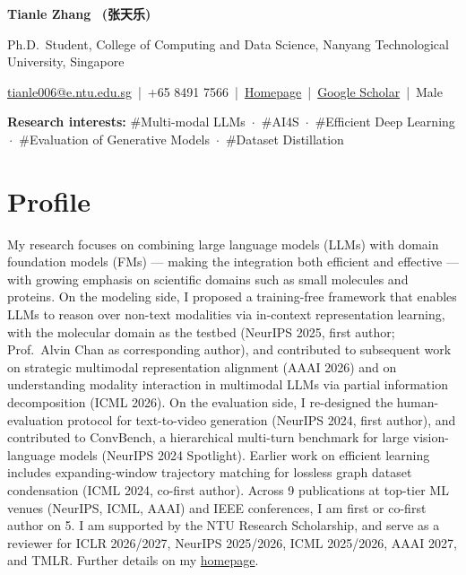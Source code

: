 \documentclass[10pt,a4paper]{article}
\begin{document}
{\Huge\bfseries Tianle Zhang \,\,{\normalsize\mdseries\,({\cjkfont 张天乐})}}\par
\vspace{2pt}
Ph.D.\ Student, College of Computing and Data Science, Nanyang Technological University, Singapore\par
\vspace{1pt}
\href{mailto:tianle006@e.ntu.edu.sg}{tianle006@e.ntu.edu.sg} \,|\, +65 8491 7566 \,|\,
\href{https://ztlmememe.github.io/}{Homepage} \,|\,
\href{https://scholar.google.com.hk/citations?user=Qbd4ybsAAAAJ&hl=en}{Google Scholar} \,|\, Male\par
\vspace{2pt}
{\small\textbf{Research interests:}\;
\#Multi-modal LLMs \,$\cdot$\, \#AI4S \,$\cdot$\, \#Efficient Deep Learning \,$\cdot$\, \#Evaluation of Generative Models \,$\cdot$\, \#Dataset Distillation}

\section*{Profile}
{\small
My research focuses on combining large language models (LLMs) with domain foundation models (FMs) ---
making the integration both efficient and effective --- with growing emphasis on scientific domains
such as small molecules and proteins. On the modeling side, I proposed a training-free framework
that enables LLMs to reason over non-text modalities via in-context representation learning, with
the molecular domain as the testbed (NeurIPS 2025, first author; Prof.\ Alvin Chan as corresponding
author), and contributed to subsequent work on strategic multimodal representation alignment
(AAAI 2026) and on understanding modality interaction in multimodal LLMs via partial information
decomposition (ICML 2026). On the evaluation side, I re-designed the human-evaluation protocol for
text-to-video generation (NeurIPS 2024, first author), and contributed to ConvBench, a hierarchical
multi-turn benchmark for large vision-language models (NeurIPS 2024 Spotlight). Earlier work on
efficient learning includes expanding-window trajectory matching for lossless graph dataset
condensation (ICML 2024, co-first author). Across 9 publications at top-tier ML venues (NeurIPS,
ICML, AAAI) and IEEE conferences, I am first or co-first author on 5. I am supported by the NTU
Research Scholarship, and serve as a reviewer for ICLR 2026/2027, NeurIPS 2025/2026, ICML 2025/2026, AAAI 2027, and TMLR.
Further details on my \href{https://ztlmememe.github.io/}{homepage}.
}
\end{document}
